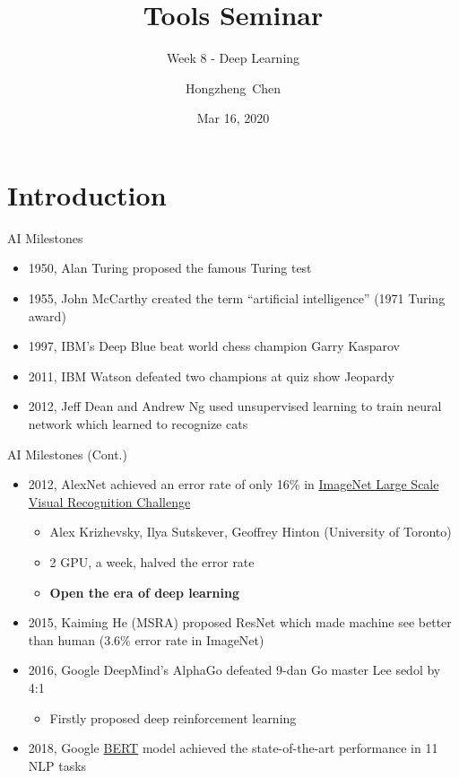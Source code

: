 \documentclass{../TexTemplate/myslide}
\title[ToolsSeminar]{Tools Seminar}
\subtitle{Week 8 - Deep Learning}
\author[chhzh123]{Hongzheng~Chen}
\date[Mar 16, 2020]{Mar 16, 2020}
\begin{document}
\begin{frame}
\titlepage
\end{frame}

\begin{frame}
\tableofcontents
\end{frame}

\section{Introduction}
\begin{frame}
\sectionpage
\end{frame}

\begin{frame}{AI Milestones}
\begin{itemize}[<+->]
\item 1950, Alan Turing proposed the famous Turing test
\item 1955, John McCarthy created the term ``artificial intelligence'' (1971 Turing award)
\item 1997, IBM's Deep Blue beat world chess champion Garry Kasparov
\item 2011, IBM Watson defeated two champions at quiz show Jeopardy
\item 2012, Jeff Dean and Andrew Ng used unsupervised learning to train neural network which learned to recognize cats
\end{itemize}
\end{frame}

\begin{frame}{AI Milestones (Cont.)}
\begin{itemize}[<+->]
\item 2012, AlexNet achieved an error rate of only 16\% in \href{http://image-net.org/challenges/LSVRC/2012/results.html}{ImageNet Large Scale Visual Recognition Challenge}
\begin{itemize}
	\item Alex Krizhevsky, Ilya Sutskever, Geoffrey Hinton (University of Toronto)
	\item 2 GPU, a week, halved the error rate
	\item \textbf{Open the era of deep learning}
\end{itemize}
\item 2015, Kaiming He (MSRA) proposed ResNet which made machine see better than human (3.6\% error rate in ImageNet)
\item 2016, Google DeepMind's AlphaGo defeated 9-dan Go master Lee sedol by 4:1
\begin{itemize}
	\item Firstly proposed deep reinforcement learning
\end{itemize}
\item 2018, Google \href{https://www.blog.google/products/search/search-language-understanding-bert/}{BERT} model achieved the state-of-the-art performance in 11 NLP tasks
\end{itemize}
\end{frame}
\end{document}
